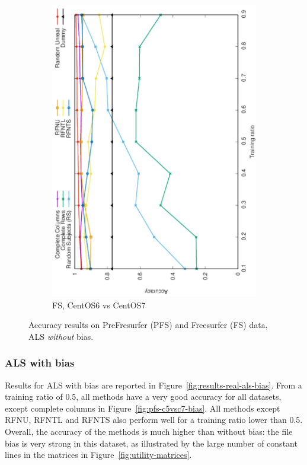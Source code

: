\documentclass[10pt, conference, compsocconf]{IEEEtran}
\begin{document}
\begin{figure}
\begin{subfigure}[b]{0.4\linewidth}
        \includegraphics[width=0.8\columnwidth, angle=-90]{data/results/means_of_results/ALS/FS-100files/ALS-FS100files.pdf}
        \caption{FS, CentOS6 vs CentOS7}
\end{subfigure}
\caption{Accuracy results on PreFresurfer (PFS) and Freesurfer (FS) data, ALS \emph{without} bias.}
\label{fig:results-real-als}
\end{figure}

\subsubsection{ALS with bias}

Results for ALS with bias are reported in 
Figure~\ref{fig:results-real-als-bias}. From a training ratio of 0.5, 
all methods have a very good accuracy for all datasets, except complete 
columns in Figure~\ref{fig:pfs-c5vsc7-bias}. All methods except RFNU, 
RFNTL and RFNTS also perform well for a training ratio lower than 0.5. 
Overall, the accuracy of the methods is much higher than without bias: 
the file bias is very strong in this dataset, as illustrated by the large number
of constant lines in the matrices in Figure~\ref{fig:utility-matrices}.
\end{document}

